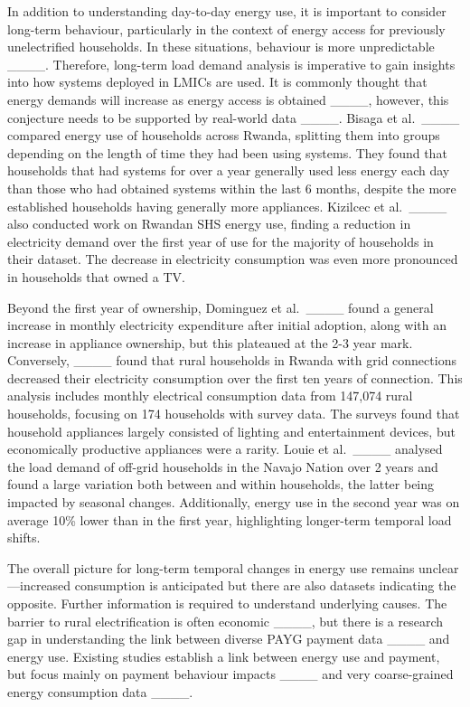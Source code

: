 In addition to understanding day-to-day energy use, it is important to consider long-term behaviour, particularly in the context of energy access for previously unelectrified households. In these situations, behaviour is more unpredictable ____. Therefore, long-term load demand analysis is imperative to gain insights into how systems deployed in LMICs are used. %
%
It is commonly thought that energy demands will increase as energy access is obtained ____, however, this conjecture needs to be supported by real-world data ____. Bisaga et al.\ ____ compared energy use of households across Rwanda, splitting them into groups depending on the length of time they had been using systems. They found that households that had systems for over a year generally used less energy each day than those who had obtained systems within the last 6 months, despite the more established households having generally more appliances. Kizilcec et al.\ ____ also conducted work on Rwandan SHS energy use, finding a reduction in electricity demand over the first year of use for the majority of households in their dataset. The decrease in electricity consumption was even more pronounced in households that owned a TV.

Beyond the first year of ownership, Dominguez et al.\ ____ found a general increase in monthly electricity expenditure after initial adoption, along with an increase in appliance ownership, but this plateaued at the 2-3 year mark. Conversely, ____ found that rural households in Rwanda with grid connections decreased their electricity consumption over the first ten years of connection. This analysis includes monthly electrical consumption data from 147,074 rural households, focusing on 174 households with survey data. The surveys found that household appliances largely consisted of lighting and entertainment devices, but economically productive appliances were a rarity. Louie et al.\ ____ analysed the load demand of off-grid households in the Navajo Nation over 2 years and found a large variation both between and within households, the latter being impacted by seasonal changes. Additionally, energy use in the second year was on average 10\% lower than in the first year, highlighting longer-term temporal load shifts. 

The overall picture for long-term temporal changes in energy use remains unclear---increased consumption is anticipated but there are also datasets indicating the opposite. Further information is required to understand underlying causes. The barrier to rural electrification is often economic ____, but there is a research gap in understanding the link between diverse PAYG payment data ____ and energy use. Existing studies establish a link between energy use and payment, but focus mainly on payment behaviour impacts ____ and very coarse-grained energy consumption data ____.

